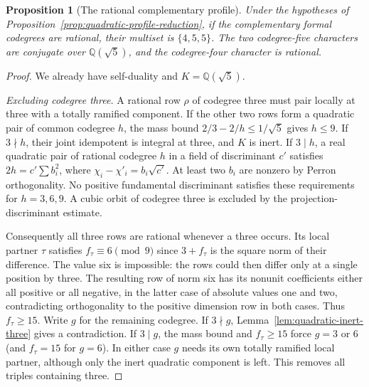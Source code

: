 \documentclass[11pt,a4paper]{article}
\newtheorem{proposition}[theorem]{Proposition}
\numberwithin{equation}{section}
\begin{document}
\begin{proposition}[The rational complementary profile]
\label{prop:quadratic-rational-profile}
Under the hypotheses of Proposition~\ref{prop:quadratic-profile-reduction},
if the complementary formal codegrees are rational, their multiset
is $\{4,5,5\}$. The two codegree-five characters are conjugate over
$\mathbb Q(\sqrt5)$, and the codegree-four character is rational.
\end{proposition}
\begin{proof}
We already have self-duality and $K=\mathbb Q(\sqrt5)$.
\par\smallskip\noindent\emph{Excluding codegree three.}\enspace
A rational row $\rho$ of codegree three
must pair locally at three with a totally ramified component.
If the other two rows form a quadratic pair of common codegree $h$,
the mass bound $2/3-2/h\le1/\sqrt5$ gives $h\le9$. If
$3\nmid h$, their joint idempotent is integral at three, and $K$ is
inert. If $3\mid h$, a real quadratic pair of rational codegree $h$
in a field of discriminant $c'$ satisfies $2h=c'\sum b_i^2$,
where $\chi_i-\chi'_i=b_i\sqrt{c'}$.
At least two $b_i$ are nonzero by Perron orthogonality.
No positive fundamental discriminant satisfies these requirements for
$h=3,6,9$. A cubic orbit of codegree three is excluded by the
projection-discriminant estimate.

Consequently all three rows are rational whenever a three occurs.
Its local partner $\tau$ satisfies $f_\tau\equiv6\pmod9$ since
$3+f_\tau$ is the square norm of their difference. The value six is
impossible: the rows could then differ only at a single position by
three. The resulting row of norm six has its nonunit coefficients
either all positive or all negative, in the latter case of
absolute values one and two, contradicting orthogonality to
the positive dimension row in both cases. Thus $f_\tau\ge15$.
Write $g$ for the remaining codegree. If $3\nmid g$, Lemma~\ref{lem:quadratic-inert-three} gives a
contradiction. If $3\mid g$, the mass bound and $f_\tau\ge15$ force $g=3$
or $6$ (and $f_\tau=15$ for $g=6$). In either case $g$ needs
its own totally ramified local partner, although only the inert
quadratic component is left. This removes all triples containing three.


\end{proof}
\end{document}
